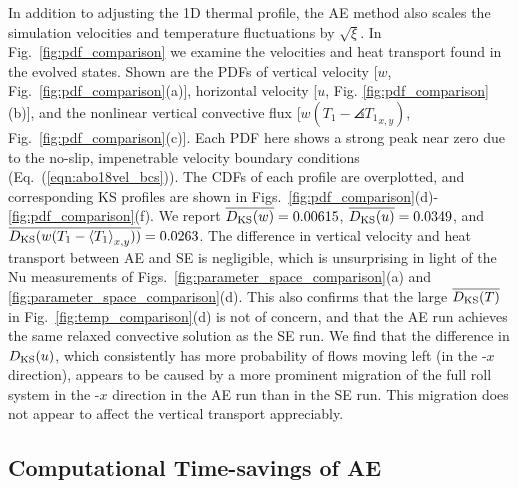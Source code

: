 In addition to adjusting the 1D thermal profile, the AE method also scales the simulation velocities and temperature fluctuations by $\sqrt{\xi}$. 
In Fig.~\ref{fig:pdf_comparison} we examine the velocities and heat transport found in the evolved states.
Shown are the PDFs of vertical velocity [$w$, Fig.~\ref{fig:pdf_comparison}(a)], horizontal velocity [$u$, Fig. \ref{fig:pdf_comparison}(b)], and the nonlinear vertical convective flux [$w(T_1 - \angles{T_1}_{x,y})$, Fig.~\ref{fig:pdf_comparison}(c)]. 
Each PDF here shows a strong peak near zero due to the no-slip, impenetrable velocity boundary conditions (Eq.~(\ref{eqn:abo18vel_bcs})).
The CDFs of each profile are overplotted, and corresponding KS profiles are shown in Figs.~\ref{fig:pdf_comparison}(d)-\ref{fig:pdf_comparison}(f).  
We report $\overline{D_\text{KS}(w)} = 0.00615$, $\overline{D_\text{KS}(u)} = 0.0349$, and $\overline{D_\text{KS}(w(T_1 - \left\langle T_1 \right\rangle_{x,y}))} = 0.0263$.
The difference in vertical velocity and heat transport between AE and SE is negligible, which is unsurprising in light of the Nu measurements of Figs.~\ref{fig:parameter_space_comparison}(a) and \ref{fig:parameter_space_comparison}(d).
This also confirms that the large $\overline{D_\text{KS}(T)}$ in Fig.~\ref{fig:temp_comparison}(d) is not of concern, and that the AE run achieves the same relaxed convective solution as the SE run.
We find that the difference in $D_{\text{KS}}(u)$, which consistently has more probability of flows moving left (in the -$x$ direction), appears to be caused by a more prominent migration of the full roll system in the -$x$ direction in the AE run than in the SE run. 
This migration does not appear to affect the vertical transport appreciably.


\subsection{Computational Time-savings of AE}
\label{sec:abo18_speedups}


